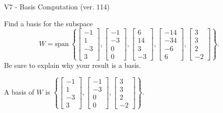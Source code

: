 \begin{exercise}
  \begin{exerciseTitle}V7 - Basis Computation (ver. 114)\end{exerciseTitle}
  \begin{exerciseStatement}
    Find a basis for the subspace 
\[W=\mathrm{span}\ \left\{\left[\begin{array}{r}
-1 \\
1 \\
-3 \\
3
\end{array}\right] , \left[\begin{array}{r}
-1 \\
-3 \\
0 \\
0
\end{array}\right] , \left[\begin{array}{r}
6 \\
14 \\
3 \\
-3
\end{array}\right] , \left[\begin{array}{r}
-14 \\
-34 \\
-6 \\
6
\end{array}\right] , \left[\begin{array}{r}
3 \\
3 \\
2 \\
-2
\end{array}\right]\right\}.\]
 Be sure to explain why your result is a basis.


  \end{exerciseStatement}
  \begin{exerciseAnswer}
   A basis of \(W\) is  \(\left\{\left[\begin{array}{r}
-1 \\
1 \\
-3 \\
3
\end{array}\right] , \left[\begin{array}{r}
-1 \\
-3 \\
0 \\
0
\end{array}\right] , \left[\begin{array}{r}
3 \\
3 \\
2 \\
-2
\end{array}\right]\right\}\).
  


  \end{exerciseAnswer}
\end{exercise}
